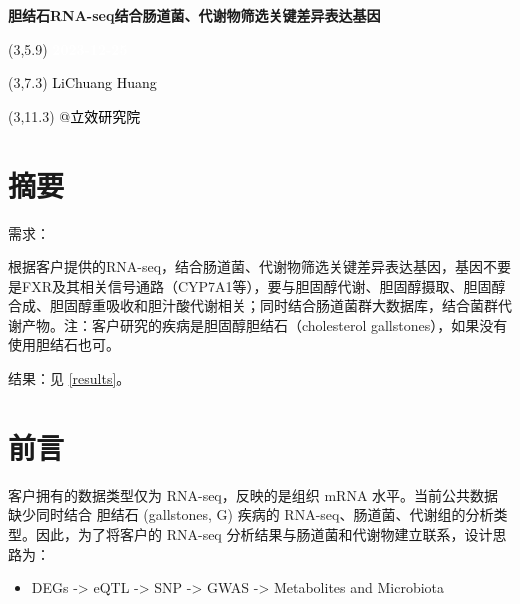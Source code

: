 \documentclass[
]{article}
\author{}
\date{\vspace{-2.5em}}
\providecommand{\tightlist}{%
  \setlength{\itemsep}{0pt}\setlength{\parskip}{0pt}}
\begin{document}
\begin{titlepage} 
\begin{center} \textbf{\Huge
胆结石RNA-seq结合肠道菌、代谢物筛选关键差异表达基因}
\vspace{4em} \begin{textblock}{10}(3,5.9) \huge
\textbf{\textcolor{white}{2023-12-25}}
\end{textblock} \begin{textblock}{10}(3,7.3)
\Large \textcolor{black}{LiChuang Huang}
\end{textblock} \begin{textblock}{10}(3,11.3)
\Large \textcolor{black}{@立效研究院}
\end{textblock} \end{center} \end{titlepage}
\restoregeometry


\tableofcontents

\listoffigures

\listoftables

\newpage


\hypertarget{abstract}{%
\section{摘要}\label{abstract}}

需求：

根据客户提供的RNA-seq，结合肠道菌、代谢物筛选关键差异表达基因，基因不要是FXR及其相关信号通路（CYP7A1等），要与胆固醇代谢、胆固醇摄取、胆固醇合成、胆固醇重吸收和胆汁酸代谢相关；同时结合肠道菌群大数据库，结合菌群代谢产物。注：客户研究的疾病是胆固醇胆结石（cholesterol gallstones），如果没有使用胆结石也可。

结果：见 \ref{results}。

\hypertarget{introduction}{%
\section{前言}\label{introduction}}

客户拥有的数据类型仅为 RNA-seq，反映的是组织 mRNA 水平。当前公共数据缺少同时结合 胆结石 (gallstones, G) 疾病的 RNA-seq、肠道菌、代谢组的分析类型。因此，为了将客户的 RNA-seq 分析结果与肠道菌和代谢物建立联系，设计思路为：

\begin{itemize}
\tightlist
\item
  DEGs -\textgreater{} eQTL -\textgreater{} SNP -\textgreater{} GWAS -\textgreater{} Metabolites and Microbiota
\end{itemize}
\end{document}
